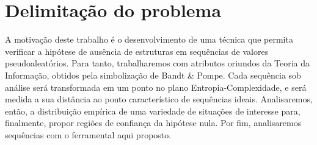 \section{Delimitação do problema} %

A motivação deste trabalho é o desenvolvimento de uma técnica que permita verificar a hipótese de ausência de estruturas em sequências de valores pseudoaleatórios.
Para tanto, trabalharemos com atributos oriundos da Teoria da Informação, obtidos pela simbolização de Bandt \& Pompe.
Cada sequência sob análise será transformada em um ponto no plano Entropia-Complexidade, e será medida a sua distância ao ponto característico de sequências ideais.
Analisaremos, então, a distribuição empírica de uma variedade de situações de interesse para, finalmente, propor regiões de confiança da hipótese nula.
Por fim, analisaremos sequências com o ferramental aqui proposto.
